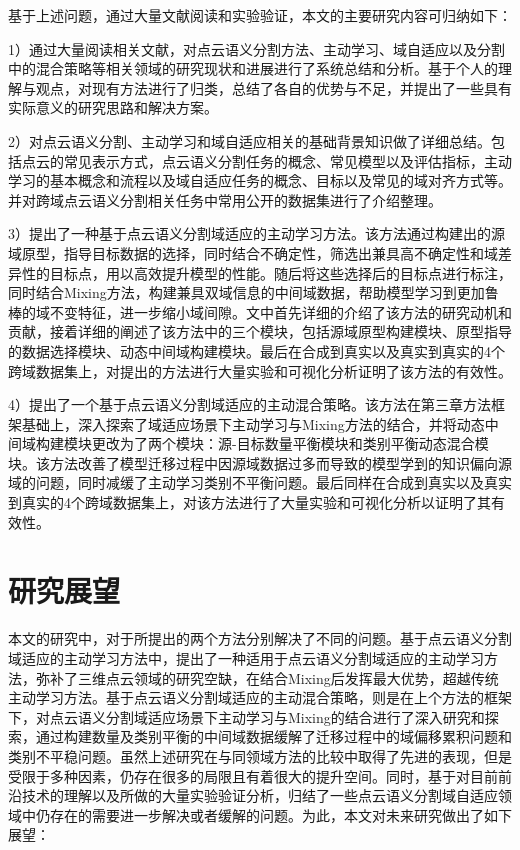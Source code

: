 基于上述问题，通过大量文献阅读和实验验证，本文的主要研究内容可归纳如下：

1）通过大量阅读相关文献，对点云语义分割方法、主动学习、域自适应以及分割中的混合策略等相关领域的研究现状和进展进行了系统总结和分析。基于个人的理解与观点，对现有方法进行了归类，总结了各自的优势与不足，并提出了一些具有实际意义的研究思路和解决方案。

2）对点云语义分割、主动学习和域自适应相关的基础背景知识做了详细总结。包括点云的常见表示方式，点云语义分割任务的概念、常见模型以及评估指标，主动学习的基本概念和流程以及域自适应任务的概念、目标以及常见的域对齐方式等。并对跨域点云语义分割相关任务中常用公开的数据集进行了介绍整理。

3）提出了一种基于点云语义分割域适应的主动学习方法。该方法通过构建出的源域原型，指导目标数据的选择，同时结合不确定性，筛选出兼具高不确定性和域差异性的目标点，用以高效提升模型的性能。随后将这些选择后的目标点进行标注，同时结合Mixing方法，构建兼具双域信息的中间域数据，帮助模型学习到更加鲁棒的域不变特征，进一步缩小域间隙。文中首先详细的介绍了该方法的研究动机和贡献，接着详细的阐述了该方法中的三个模块，包括源域原型构建模块、原型指导的数据选择模块、动态中间域构建模块。最后在合成到真实以及真实到真实的4个跨域数据集上，对提出的方法进行大量实验和可视化分析证明了该方法的有效性。

4）提出了一个基于点云语义分割域适应的主动混合策略。该方法在第三章方法框架基础上，深入探索了域适应场景下主动学习与Mixing方法的结合，并将动态中间域构建模块更改为了两个模块：源-目标数量平衡模块和类别平衡动态混合模块。该方法改善了模型迁移过程中因源域数据过多而导致的模型学到的知识偏向源域的问题，同时减缓了主动学习类别不平衡问题。最后同样在合成到真实以及真实到真实的4个跨域数据集上，对该方法进行了大量实验和可视化分析以证明了其有效性。



\section{研究展望}
本文的研究中，对于所提出的两个方法分别解决了不同的问题。基于点云语义分割域适应的主动学习方法中，提出了一种适用于点云语义分割域适应的主动学习方法，弥补了三维点云领域的研究空缺，在结合Mixing后发挥最大优势，超越传统主动学习方法。基于点云语义分割域适应的主动混合策略，则是在上个方法的框架下，对点云语义分割域适应场景下主动学习与Mixing的结合进行了深入研究和探索，通过构建数量及类别平衡的中间域数据缓解了迁移过程中的域偏移累积问题和类别不平稳问题。虽然上述研究在与同领域方法的比较中取得了先进的表现，但是受限于多种因素，仍存在很多的局限且有着很大的提升空间。同时，基于对目前前沿技术的理解以及所做的大量实验验证分析，归结了一些点云语义分割域自适应领域中仍存在的需要进一步解决或者缓解的问题。为此，本文对未来研究做出了如下展望：


